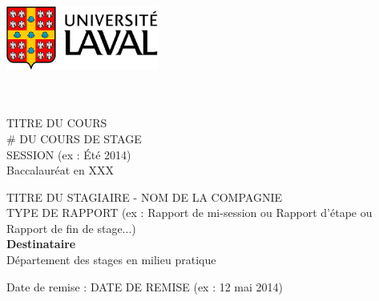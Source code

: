 \documentclass[12pt]{article} 	%
\begin{document}
\thispagestyle{empty}
		\begin{minipage}[t]{8.5cm}
			\vspace{0pt}
			\begin{flushleft}
				\hspace{-1cm}\includegraphics[width=5cm]{logo.jpg}\\
				\\[-0.2cm]

			\end{flushleft}
		\end{minipage}
		\begin{minipage}[t]{8.5cm}
				\begin{flushright}		
						\hspace*{2cm} \\
						\hspace*{1cm}TITRE DU COURS \\
						\hspace*{1cm}\# DU COURS DE STAGE\\
						\hspace*{1cm}SESSION (ex : Été 2014)\\
						\hspace*{1cm}Baccalauréat en XXX\\
				\end{flushright}		
		\end{minipage}

\vspace{4cm}
\begin{center}
	\large TITRE DU STAGIAIRE - NOM DE LA COMPAGNIE \\
	\vspace{1cm}
	\large TYPE DE RAPPORT (ex : Rapport de mi-session ou Rapport d'étape ou Rapport de fin de stage...)\\

	\vspace{5cm}
	\fontsize{15}{15}\textbf {Destinataire}\\

	\vspace{0.5cm}
	\large Département des stages en milieu pratique \\

\end{center}
\vspace{3cm}
\begin{flushleft}
	Date de remise : DATE DE REMISE (ex : 12 mai 2014)
\end{flushleft}
\end{document}
